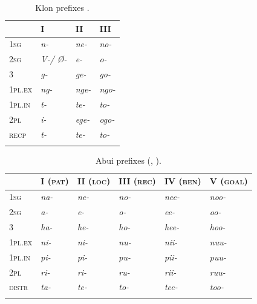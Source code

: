 \begin{table}
\begin{tabularx}{.5\textwidth}{XXXX}
\lsptoprule
& I & II & III\\
\midrule
1\textsc{sg} & {\itshape n-} & {\itshape ne-} & {\itshape no-}\\
2\textsc{sg} & {\itshape V-/ {\O}-} & {\itshape e-} & {\itshape o-}\\
3 & {\itshape g-} & {\itshape ge-} & {\itshape go-}\\
{\scshape 1pl.ex} & {\itshape ng-} & {\itshape nge-} & {\itshape ngo-}\\
{\scshape 1pl.in} & {\itshape t-} & {\itshape te-} & {\itshape to-}\\
{\scshape 2pl} & {\itshape i-} & {\itshape ege-} & {\itshape ogo-}\\
{\scshape recp} & {\itshape t-} & {\itshape te-} & {\itshape to-}\\
\lspbottomrule
\end{tabularx}
\caption{Klon prefixes \citep[69, 39]{Baird2008}.}
\label{tab:1:5}
\end{table}

 


\begin{table} 
\begin{tabularx}{\textwidth}{XXXXXX}
\lsptoprule
 & {\scshape I (pat)} & {\scshape II (loc)} & {\scshape III (rec)} & {\scshape IV (ben)} & {\scshape V (goal)}\\
\midrule 
1\textsc{sg} & {\itshape na-} & {\itshape ne-} & {\itshape no-} & {\itshape nee-} & {\itshape noo-}\\
2\textsc{sg} & {\itshape a-} & {\itshape e-} & {\itshape o-} & {\itshape ee-} & {\itshape oo-}\\
3 & {\itshape ha-} & {\itshape he-} & {\itshape ho-} & {\itshape hee-} & {\itshape hoo-}\\
{\scshape 1pl.ex} & {\itshape ni-} & {\itshape ni-} & {\itshape nu-} & {\itshape nii-} & {\itshape nuu-}\\
{\scshape 1pl.in} & {\itshape pi-} & {\itshape pi-} & {\itshape pu-} & {\itshape pii-} & {\itshape puu-}\\
{\scshape 2pl} & {\itshape ri-} & {\itshape ri-} & {\itshape ru-} & {\itshape rii-} & {\itshape ruu-}\\
{\scshape distr} & {\itshape ta-} & {\itshape te-} & {\itshape to-} & {\itshape tee-} & {\itshape too-}\\
\lspbottomrule
\end{tabularx}

\caption{Abui prefixes (\citealt[78]{Kratochvil2007}, \citealt[591]{Kratochvil2011transitivity}).}
\label{tab:1:6}
\end{table}


